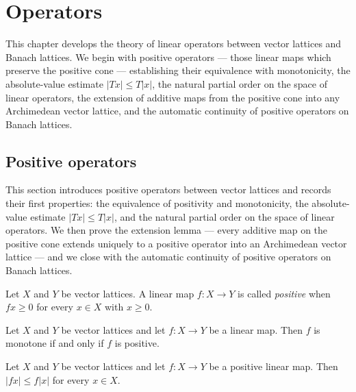 \chapter{Operators}

This chapter develops the theory of linear operators between vector
lattices and Banach lattices. We begin with positive operators —
those linear maps which preserve the positive cone — establishing
their equivalence with monotonicity, the absolute-value estimate
$\lvert T x \rvert \le T \lvert x \rvert$, the natural partial
order on the space of linear operators, the extension of additive
maps from the positive cone into any Archimedean vector lattice,
and the automatic continuity of positive operators on Banach
lattices.

\section{Positive operators}

This section introduces positive operators between vector lattices
and records their first properties: the equivalence of positivity
and monotonicity, the absolute-value estimate $\lvert T x \rvert
\le T \lvert x \rvert$, and the natural partial order on the space
of linear operators. We then prove the extension lemma — every
additive map on the positive cone extends uniquely to a positive
operator into an Archimedean vector lattice — and we close with the
automatic continuity of positive operators on Banach lattices.

\begin{definition}
\label{def:positive-operator}
\leanok
{}
Let $X$ and $Y$ be vector lattices. A linear map $f \colon X \to Y$
is called \emph{positive} when $f x \ge 0$ for every $x \in X$
with $x \ge 0$.
\end{definition}

\begin{theorem}
\label{thm:positive-monotone-iff}
\leanok
{}
Let $X$ and $Y$ be vector lattices and let $f \colon X \to Y$ be a
linear map. Then $f$ is monotone if and only if $f$ is positive.
\end{theorem}

\begin{theorem}
\label{thm:positive-abs-le-map-abs}
\leanok
{}
Let $X$ and $Y$ be vector lattices and let $f \colon X \to Y$ be a
positive linear map. Then $\lvert f x \rvert \le f \lvert x \rvert$
for every $x \in X$.
\end{theorem}

